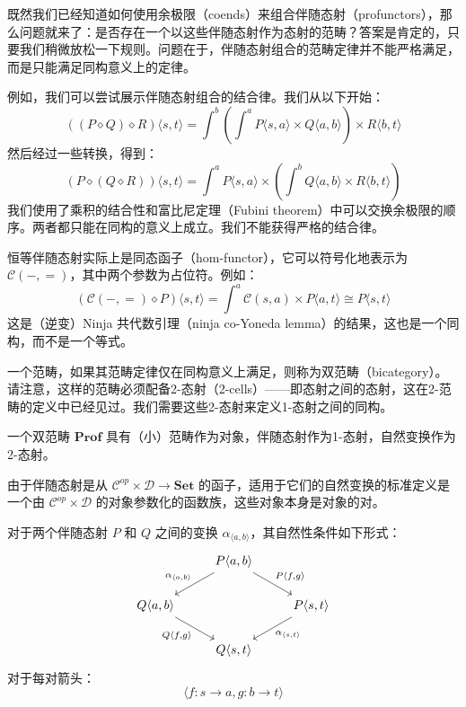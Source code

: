 \documentclass[DaoFP]{subfiles}
\begin{document}
 既然我们已经知道如何使用余极限（coends）来组合伴随态射（profunctors），那么问题就来了：是否存在一个以这些伴随态射作为态射的范畴？答案是肯定的，只要我们稍微放松一下规则。问题在于，伴随态射组合的范畴定律并不能严格满足，而是只能满足同构意义上的定律。

 例如，我们可以尝试展示伴随态射组合的结合律。我们从以下开始：
 \[ ((P \diamond Q) \diamond R) \langle s, t \rangle = \int^b \left( \int^a P \langle s, a \rangle \times Q \langle a, b \rangle \right) \times R \langle b,  t \rangle \]
 然后经过一些转换，得到：
 \[ (P \diamond (Q \diamond R)) \langle s, t \rangle =  \int^a P \langle s, a \rangle \times \left( \int^b Q \langle a, b \rangle \times R \langle b,  t \rangle \right) \]
 我们使用了乘积的结合性和富比尼定理（Fubini theorem）中可以交换余极限的顺序。两者都只能在同构的意义上成立。我们不能获得严格的结合律。

 恒等伴随态射实际上是同态函子（hom-functor），它可以符号化地表示为 $\mathcal{C}(-, =)$，其中两个参数为占位符。例如：
 \[ \left( \mathcal{C}(-, =) \diamond P \right) \langle s, t \rangle = \int^a  \mathcal{C}(s, a) \times P \langle a, t \rangle \cong P \langle s, t \rangle \]
 这是（逆变）Ninja 共代数引理（ninja co-Yoneda lemma）的结果，这也是一个同构，而不是一个等式。

 一个范畴，如果其范畴定律仅在同构意义上满足，则称为双范畴（bicategory）。请注意，这样的范畴必须配备2-态射（2-cells）——即态射之间的态射，这在2-范畴的定义中已经见过。我们需要这些2-态射来定义1-态射之间的同构。

 一个双范畴 $\mathbf{Prof}$ 具有（小）范畴作为对象，伴随态射作为1-态射，自然变换作为2-态射。

 由于伴随态射是从 $\mathcal{C}^{op} \times  \mathcal{D} \to \mathbf{Set}$ 的函子，适用于它们的自然变换的标准定义是一个由 $\mathcal{C}^{op} \times  \mathcal{D}$ 的对象参数化的函数族，这些对象本身是对象的对。

 对于两个伴随态射 $P$ 和 $Q$ 之间的变换 $\alpha_{\langle a, b \rangle}$，其自然性条件如下形式：
 \[
  \begin{tikzcd}
   &P \langle a, b \rangle
   \arrow[ld, "{\alpha_{\langle a, b \rangle}}"']
   \arrow[rd, "{P \langle f, g \rangle}"]
   \\
   Q \langle a, b \rangle
   \arrow[dr, "{Q \langle f, g \rangle}"']
   &&P \langle s, t \rangle
   \arrow[dl, "{\alpha_{\langle s, t \rangle}}"]
   \\
   & Q \langle s, t \rangle
  \end{tikzcd}
 \]
 对于每对箭头：
 \[ \langle f \colon s \to a, g \colon b \to t \rangle \]
\end{document}
